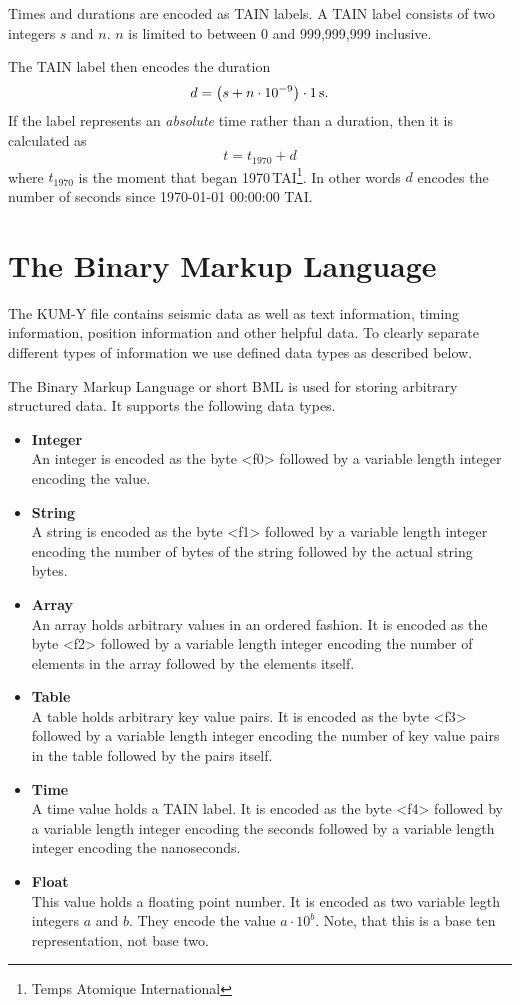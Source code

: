 \documentclass[DIV=10]{scrartcl}
\begin{document}
Times and durations are encoded as TAIN labels.
A TAIN label consists of two integers \(s\) and \(n\).
\(n\) is limited to between 0 and 999,999,999 inclusive.

The TAIN label then encodes the duration
\[
  d = \left(s + n\cdot10^{-9}\right) \cdot 1\text{\,s}.
\]
If the label represents an \emph{absolute} time rather than a duration, then it is calculated as
\[
  t = t_{1970} + d
\]
where \(t_{1970}\) is the moment that began 1970\,TAI\footnote{Temps Atomique International}.
In other words \(d\) encodes the number of seconds since \mbox{1970-01-01} \mbox{00:00:00} TAI.

\clearpage
\section{The Binary Markup Language}

The KUM-Y file contains seismic data as well as text information, timing information, position information and other helpful data. To clearly separate different types of information we use defined data types as described below.

The Binary Markup Language or short BML is used for storing arbitrary structured data.
It supports the following data types.

\begin{itemize}
\item \textbf{Integer}\\
An integer is encoded as the byte <f0> followed by a variable length integer encoding the value.

\item \textbf{String}\\
A string is encoded as the byte <f1> followed by a variable length integer encoding the number of bytes of the string followed by the actual string bytes.

\item \textbf{Array}\\
An array holds arbitrary values in an ordered fashion.
It is encoded as the byte <f2> followed by a variable length integer encoding the number of elements in the array followed by the elements itself.

\item \textbf{Table}\\
A table holds arbitrary key value pairs.
It is encoded as the byte <f3> followed by a variable length integer encoding the number of key value pairs in the table followed by the pairs itself.

\item \textbf{Time}\\
A time value holds a TAIN label.
It is encoded as the byte <f4> followed by a variable length integer encoding the seconds followed by a variable length integer encoding the nanoseconds.

\item \textbf{Float}\\
This value holds a floating point number.
It is encoded as two variable legth integers \(a\) and \(b\).
They encode the value \(a\cdot10^b\).
Note, that this is a base ten representation, not base two.
\end{itemize}
\end{document}
